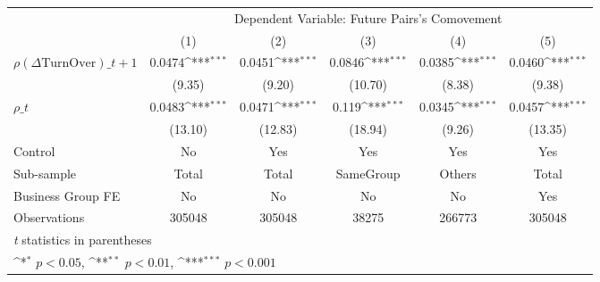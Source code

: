 {
\def\sym#1{\ifmmode^{#1}\else\(^{#1}\)\fi}
\begin{tabular}{l*{5}{c}}
\hline\hline
                    &\multicolumn{5}{c}{Dependent Variable:  Future Pairs's Comovement}                                           \\\cmidrule(lr){2-6}
                    &\multicolumn{1}{c}{(1)}         &\multicolumn{1}{c}{(2)}         &\multicolumn{1}{c}{(3)}         &\multicolumn{1}{c}{(4)}         &\multicolumn{1}{c}{(5)}         \\
\hline
 $ {\rho(\Delta \text{TurnOver})\_{t+1}} $ &      0.0474\sym{***}&      0.0451\sym{***}&      0.0846\sym{***}&      0.0385\sym{***}&      0.0460\sym{***}\\
                    &      (9.35)         &      (9.20)         &     (10.70)         &      (8.38)         &      (9.38)         \\
[1em]
 $ {\rho\_t} $       &      0.0483\sym{***}&      0.0471\sym{***}&       0.119\sym{***}&      0.0345\sym{***}&      0.0457\sym{***}\\
                    &     (13.10)         &     (12.83)         &     (18.94)         &      (9.26)         &     (13.35)         \\
\hline
Control             &          No         &         Yes         &         Yes         &         Yes         &         Yes         \\
Sub-sample          &       Total         &       Total         &   SameGroup         &      Others         &       Total         \\
Business Group FE   &          No         &          No         &          No         &          No         &         Yes         \\
Observations        &      305048         &      305048         &       38275         &      266773         &      305048         \\
\hline\hline
\multicolumn{6}{l}{\footnotesize \textit{t} statistics in parentheses}\\
\multicolumn{6}{l}{\footnotesize \sym{*} \(p<0.05\), \sym{**} \(p<0.01\), \sym{***} \(p<0.001\)}\\
\end{tabular}
}
